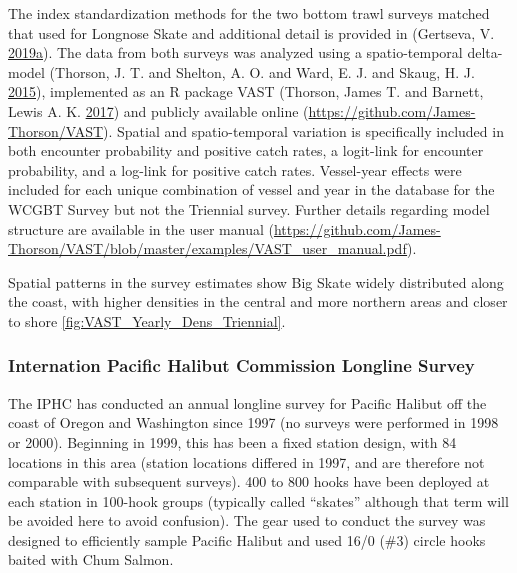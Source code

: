 \documentclass[12pt,]{article}
\begin{document}
The index standardization methods for the two bottom trawl surveys
matched that used for Longnose Skate and additional detail is provided
in (Gertseva, V.
\protect\hyperlink{ref-Gertseva2019}{2019}\protect\hyperlink{ref-Gertseva2019}{a}).
The data from both surveys was analyzed using a spatio-temporal
delta-model (Thorson, J. T. and Shelton, A. O. and Ward, E. J. and
Skaug, H. J. \protect\hyperlink{ref-Thorson2015}{2015}), implemented as
an R package VAST (Thorson, James T. and Barnett, Lewis A. K.
\protect\hyperlink{ref-Thorson2017a}{2017}) and publicly available
online (\url{https://github.com/James-Thorson/VAST}). Spatial and
spatio-temporal variation is specifically included in both encounter
probability and positive catch rates, a logit-link for encounter
probability, and a log-link for positive catch rates. Vessel-year
effects were included for each unique combination of vessel and year in
the database for the WCGBT Survey but not the Triennial survey. Further
details regarding model structure are available in the user manual
(\url{https://github.com/James-Thorson/VAST/blob/master/examples/VAST_user_manual.pdf}).

Spatial patterns in the survey estimates show Big Skate widely
distributed along the coast, with higher densities in the central and
more northern areas and closer to shore
\ref{fig:VAST_Yearly_Dens_Triennial}.

\hypertarget{internation-pacific-halibut-commission-longline-survey}{%
\subsubsection{Internation Pacific Halibut Commission Longline
Survey}\label{internation-pacific-halibut-commission-longline-survey}}

The IPHC has conducted an annual longline survey for Pacific Halibut off
the coast of Oregon and Washington since 1997 (no surveys were performed
in 1998 or 2000). Beginning in 1999, this has been a fixed station
design, with 84 locations in this area (station locations differed in
1997, and are therefore not comparable with subsequent surveys). 400 to
800 hooks have been deployed at each station in 100-hook groups
(typically called ``skates'' although that term will be avoided here to
avoid confusion). The gear used to conduct the survey was designed to
efficiently sample Pacific Halibut and used 16/0 (\#3) circle hooks
baited with Chum Salmon.
\end{document}

